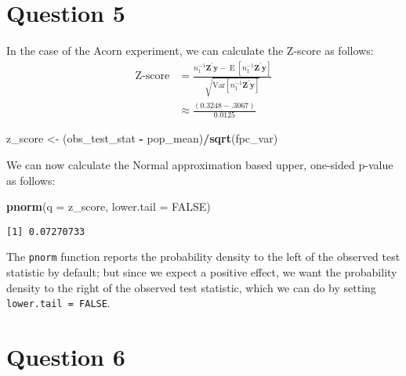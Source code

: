 \documentclass[
  12pt,
  leqno]{article}
\newenvironment{Shaded}{\begin{snugshade}}{\end{snugshade}}
\newcommand{\DataTypeTok}[1]{\textcolor[rgb]{0.13,0.29,0.53}{#1}}
\newcommand{\KeywordTok}[1]{\textcolor[rgb]{0.13,0.29,0.53}{\textbf{#1}}}
\newcommand{\NormalTok}[1]{#1}
\newcommand{\OperatorTok}[1]{\textcolor[rgb]{0.81,0.36,0.00}{\textbf{#1}}}
\newcommand{\OtherTok}[1]{\textcolor[rgb]{0.56,0.35,0.01}{#1}}
\newcommand{\StringTok}[1]{\textcolor[rgb]{0.31,0.60,0.02}{#1}}
\DeclareMathOperator{\E}{\mathrm{E}}
\DeclareMathOperator{\1}{\mathbbm{1}}
\begin{document}
\section*{Question 5}

In the case of the Acorn experiment, we can calculate the Z-score as
follows: \begin{align*}
\text{Z-score} & = \frac{n_1^{-1}\mathbf{Z}^{\prime}\mathbf{y} - \E\left[n_1^{-1}\mathbf{Z}^{\prime}\mathbf{y}\right]}{\sqrt{\mathrm{Var}\left[n_1^{-1}\mathbf{Z}^{\prime}\mathbf{y}\right]}} \\
& \approx \frac{\left(0.3248 - .3067\right)}{0.0125}
\end{align*}

\scriptsize

\begin{Shaded}
\begin{Highlighting}[]
\NormalTok{z\_score \textless{}{-}}\StringTok{ }\NormalTok{(obs\_test\_stat }\OperatorTok{{-}}\StringTok{ }\NormalTok{pop\_mean)}\OperatorTok{/}\KeywordTok{sqrt}\NormalTok{(fpc\_var)}
\end{Highlighting}
\end{Shaded}

\normalsize

We can now calculate the Normal approximation based upper, one-sided
p-value as follows:

\scriptsize

\begin{Shaded}
\begin{Highlighting}[]
\KeywordTok{pnorm}\NormalTok{(}\DataTypeTok{q =}\NormalTok{ z\_score, }\DataTypeTok{lower.tail =} \OtherTok{FALSE}\NormalTok{)}
\end{Highlighting}
\end{Shaded}

\begin{verbatim}
[1] 0.07270733
\end{verbatim}

\normalsize

The \texttt{pnorm} function reports the probability density to the left
of the observed test statistic by default; but since we expect a
positive effect, we want the probability density to the right of the
observed test statistic, which we can do by setting
\texttt{lower.tail = FALSE}.

\section*{Question 6}
\end{document}
